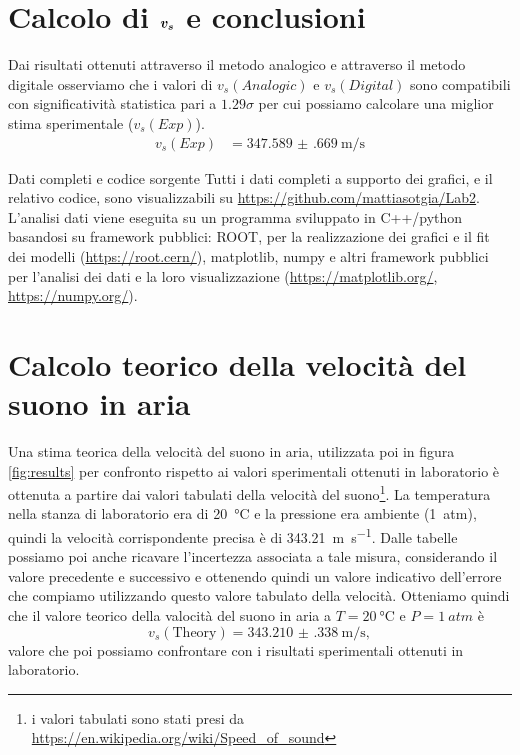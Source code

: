 \documentclass[
    rmp,
    reprint, 
    superscriptaddress, 
    altaffilletter, 
    amsmath, 
    amssymb, 
    a4paper,
    varvw]{revtex4-2}
\begin{document}
\iffalse
\fi

\section{Calcolo di $\vb*{v_s}$ e conclusioni}
Dai risultati ottenuti attraverso il metodo analogico e attraverso il metodo digitale osserviamo che i valori di $v_s(Analogic)$ e $v_s(Digital)$ sono compatibili con significatività statistica pari a $1.29\sigma$ per cui possiamo calcolare una miglior stima sperimentale ($v_s(Exp)$). 
\begin{align*}
    v_s(Exp) &= \SI{347.589(669)}{\metre\per\second}
\end{align*}


\begin{methods}{D\lowercase{ati completi e codice sorgente}}
    Tutti i dati completi a supporto dei grafici, e il relativo codice, sono visualizzabili su \url{https://github.com/mattiasotgia/Lab2}. L'analisi dati viene eseguita su un programma sviluppato in C++/python basandosi su framework pubblici: ROOT, per la realizzazione dei grafici e il fit dei modelli (\url{https://root.cern/}), matplotlib, numpy e altri framework pubblici per l'analisi dei dati e la loro visualizzazione (\url{https://matplotlib.org/}, \url{https://numpy.org/}).
\end{methods}

\appendix

\section{Calcolo teorico della velocità del suono in aria}
Una stima teorica della velocità del suono in aria, utilizzata poi in figura \ref{fig:results} per confronto rispetto ai valori sperimentali ottenuti in laboratorio è ottenuta a partire dai valori tabulati della velocità del suono\footnote{i valori tabulati sono stati presi da \url{https://en.wikipedia.org/wiki/Speed_of_sound}}. La temperatura nella stanza di laboratorio era di \SI{20}{\celsius} e la pressione era ambiente (\SI{1}{atm}), quindi la velocità corrispondente precisa è di \SI{343.21}{\metre\per\second}. Dalle tabelle possiamo poi anche ricavare l'incertezza associata a tale misura, considerando il valore precedente e successivo e ottenendo quindi un valore indicativo dell'errore che compiamo utilizzando questo valore tabulato della velocità. Otteniamo quindi che il valore teorico della valocità del suono in aria a $T=\SI{20}{\celsius}$ e $P=\SI{1}{atm}$ è \[v_s(\text{Theory}) = \SI{343.210(338)}{\metre\per\second},\] valore che poi possiamo confrontare con i risultati sperimentali ottenuti in laboratorio. 

\setcounter{table}{0}
\renewcommand{\thetable}{A-\Roman{table}}
\end{document}

